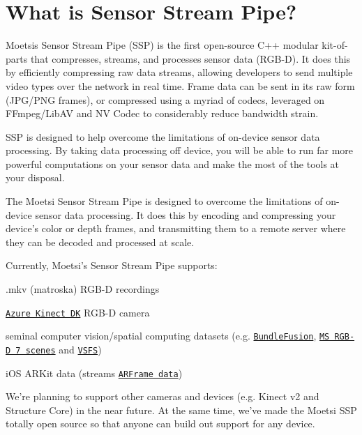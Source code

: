 

\section*{What is Sensor Stream Pipe?}

Moetsi\textquotesingle{}s Sensor Stream Pipe (S\+SP) is the first open-\/source C++ modular kit-\/of-\/parts that compresses, streams, and processes sensor data (R\+G\+B-\/D). It does this by efficiently compressing raw data streams, allowing developers to send multiple video types over the network in real time. Frame data can be sent in its raw form (J\+P\+G/\+P\+NG frames), or compressed using a myriad of codecs, leveraged on F\+Fmpeg/\+Lib\+AV and NV Codec to considerably reduce bandwidth strain.

S\+SP is designed to help overcome the limitations of on-\/device sensor data processing. By taking data processing off device, you will be able to run far more powerful computations on your sensor data and make the most of the tools at your disposal.

The Moetsi Sensor Stream Pipe is designed to overcome the limitations of on-\/device sensor data processing. It does this by encoding and compressing your device’s color or depth frames, and transmitting them to a remote server where they can be decoded and processed at scale.

Currently, Moetsi’s Sensor Stream Pipe supports\+:


\begin{DoxyItemize}
\item .mkv (matroska) R\+G\+B-\/D recordings
\item \href{https://azure.microsoft.com/en-us/services/kinect-dk/}{\tt Azure Kinect DK} R\+G\+B-\/D camera
\item seminal computer vision/spatial computing datasets (e.\+g. \href{https://graphics.stanford.edu/projects/bundlefusion/}{\tt Bundle\+Fusion}, \href{https://www.microsoft.com/en-us/research/project/rgb-d-dataset-7-scenes/}{\tt MS R\+G\+B-\/D 7 scenes} and \href{http://graphics.stanford.edu/projects/vsfs/}{\tt V\+S\+FS})
\item i\+OS A\+R\+Kit data (streams \href{https://developer.apple.com/documentation/arkit/arframe}{\tt A\+R\+Frame data})
\end{DoxyItemize}

We’re planning to support other cameras and devices (e.\+g. Kinect v2 and Structure Core) in the near future. At the same time, we’ve made the Moetsi S\+SP totally open source so that anyone can build out support for any device.

